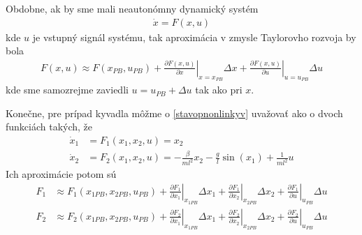 \documentclass[a4paper, 10pt, ]{article}
\begin{document}
Obdobne, ak by sme mali neautonómny dynamický systém
\begin{align}
    \dot x = F(x, u)
\end{align}
kde $u$ je vstupný signál systému, tak aproximácia v zmysle Taylorovho rozvoja by bola
\begin{align}
    F(x, u) 
    \approx F(x_{PB}, u_{PB}) 
    + \left. \frac{\partial F(x,u)}{\partial x} \right|_{x=x_{PB}}\Delta x
    + \left. \frac{\partial F(x,u)}{\partial u} \right|_{u=u_{PB}}\Delta u
\end{align}
kde sme samozrejme zaviedli $u = u_{PB} + \Delta u$ tak ako pri $x$.

Konečne, pre prípad kyvadla môžme o \eqref{stavopnonlinkyv} uvažovať ako o dvoch funkciách takých, že
\begin{align}
    \dot x_1 &= F_1(x_1, x_2, u) = x_2 \\
    \dot x_2 &= F_2(x_1, x_2, u) = - \frac{\beta}{ml^2} x_2 - \frac{g}{l} \sin\left(x_1\right) + \frac{1}{ml^2} u
\end{align}
Ich aproximácie potom sú
\begin{align}
    F_1 
    &\approx F_1(x_{1PB}, x_{2PB}, u_{PB}) 
    + \left. \frac{\partial F_1}{\partial x_1} \right|_{x_{1PB}}\Delta x_1
    + \left. \frac{\partial F_1}{\partial x_2} \right|_{x_{2PB}}\Delta x_2
    + \left. \frac{\partial F_1}{\partial u} \right|_{u_{PB}}\Delta u
    \\
    F_2 
    &\approx F_2(x_{1PB}, x_{2PB}, u_{PB}) 
    + \left. \frac{\partial F_2}{\partial x_1} \right|_{x_{1PB}}\Delta x_1
    + \left. \frac{\partial F_2}{\partial x_2} \right|_{x_{2PB}}\Delta x_2
    + \left. \frac{\partial F_2}{\partial u} \right|_{u_{PB}}\Delta u
\end{align}
\end{document}
